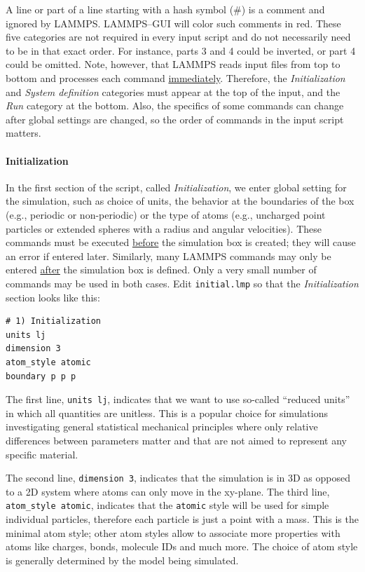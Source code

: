 \documentclass[9pt,tutorial]{livecoms}
\renewcommand{\emph}[1]{\underline{#1}} %
\newcommand{\lmpcmd}[1]{\hspace{0pt}\colorbox{listing}{\textcolor{command}{\texttt{#1}}}\hspace{0pt}} %
\newcommand{\flecmd}[1]{\textcolor{command}{\texttt{#1}}} %
\begin{document}
A line or part of a line starting with a hash symbol ($\#$) is a comment
and ignored by LAMMPS.  LAMMPS--GUI will color such comments in red.
These five categories are not required in every input script and do not
necessarily need to be in that exact order.  For instance, parts 3 and 4
could be inverted, or part 4 could be omitted.  Note, however, that
LAMMPS reads input files from top to bottom and processes each command
\emph{immediately}.  Therefore, the \textit{Initialization} and
\textit{System definition} categories must appear at the top of the
input, and the \textit{Run} category at the bottom.  Also, the specifics
of some commands can change after global settings are changed, so the
order of commands in the input script matters.

\paragraph{Initialization}

In the first section of the script, called \textit{Initialization}, we
enter global setting for the simulation, such as choice of units, the
behavior at the boundaries of the box (e.g., periodic or non-periodic)
or the type of atoms (e.g., uncharged point particles or extended
spheres with a radius and angular velocities).  These commands must be
executed \emph{before} the simulation box is created; they will cause an
error if entered later.  Similarly, many LAMMPS commands may only be
entered \emph{after} the simulation box is defined.  Only a very small
number of commands may be used in both cases.  Edit \flecmd{initial.lmp}
so that the \textit{Initialization} section looks like this:

\begin{lstlisting}
# 1) Initialization
units lj
dimension 3
atom_style atomic
boundary p p p
\end{lstlisting}

The first line, \lmpcmd{units lj}, indicates that we want to use
so-called ``reduced units'' in which all quantities are unitless.  This
is a popular choice for simulations investigating general statistical
mechanical principles where only relative differences between parameters
matter and that are not aimed to represent any specific material.

The second line, \lmpcmd{dimension 3}, indicates that the simulation is
in 3D as opposed to a 2D system where atoms can only move in the
xy-plane.  The third line, \lmpcmd{atom\_style atomic}, indicates that
the \lmpcmd{atomic} style will be used for simple individual particles,
therefore each particle is just a point with a mass.  This is the
minimal atom style; other atom styles allow to associate more properties
with atoms like charges, bonds, molecule IDs and much more.  The choice
of atom style is generally determined by the model being simulated.
\end{document}
